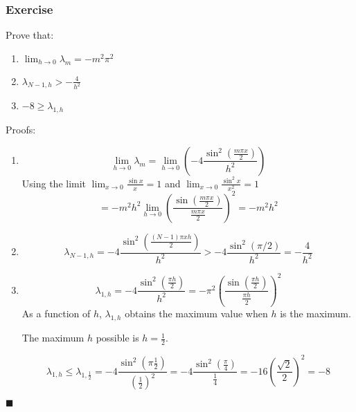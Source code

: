 \subsubsection{Exercise}

Prove that:
\begin{enumerate}
	\item $\lim_{h \rightarrow 0} \lambda_m = - m^2 \pi^2$
	\item $\lambda_{N - 1, h} > - \frac{4}{h^2}$
	\item $- 8 \ge \lambda_{1,h}$
\end{enumerate}

Proofs:
\begin{enumerate}
	\item 
\begin{equation*}
\lim_{h \rightarrow 0} \lambda_m = \lim_{h \rightarrow 0}( -4 \frac{\sin^2(\frac{m \pi x}{2})}{h^2})
\end{equation*}
	Using the limit $\lim_{x \rightarrow 0} \frac{\sin x}{x} = 1$ and $\lim_{x \rightarrow 0} \frac{\sin^2 x}{x^2} = 1$
\begin{equation*}
= -m^2 h^2 \lim_{h \rightarrow 0} (\frac{\sin(\frac{m \pi x}{2})}{\frac{m \pi x}{2}})^2 = - m^2 h^2
\end{equation*}
	
	\item
\begin{equation*}
\lambda_{N - 1, h} = - 4 \frac{\sin^2(\frac{(N-1) \pi x h}{2})}{h^2} > -4 \frac{\sin^2(\pi/2)}{h^2} = - \frac{4}{h^2}
\end{equation*}

	\item 
\begin{equation*}
\lambda_{1,h} = - 4 \frac{\sin^2(\frac{\pi h}{2})}{h^2} = - \pi^2 ( \frac{\sin (\frac{\pi h}{2})}{\frac{\pi h}{2}})^2
\end{equation*}
As a function of $h$, $\lambda_{1, h}$ obtains the maximum value when $h$ is the maximum.

The maximum $h$ possible is $h = \frac{1}{2}$.

\begin{equation*}
\lambda_{1,h} \le \lambda_{1, \frac{1}{2}} = - 4 \frac{\sin^2(\pi \frac{1}{2})}{(\frac{1}{2})^2} = -4 \frac{\sin^2(\frac{\pi}{4})}{\frac{1}{4}} = - 16 (\frac{\sqrt{2}}{2})^2 = -8
\end{equation*}

\end{enumerate}

$\blacksquare$

